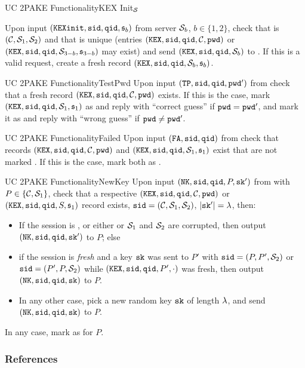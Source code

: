\documentclass[notes,xcolor=dvipsnames]{beamer}
\begin{document}
\begin{frame}{UC 2PAKE Functionality}{KEX Init$_\mathcal{S}$}
  
Upon input $(\mathtt{KEXinit}, \mathtt{sid}, \mathtt{qid}, \mathfrak{s}_b)$ from server $\mathcal{S}_b$, $b\in\{1,2\}$, check that \sid is $(\mathcal{C}, \mathcal{S}_1, \mathcal{S}_2)$ and that \qid is unique (entries $(\mathtt{KEX}, \mathtt{sid}, \mathtt{qid}, \mathcal{C}, \mathtt{pwd})$ or $(\mathtt{KEX}, \mathtt{sid}, \mathtt{qid}, \mathcal{S}_{3-b}, \mathfrak{s}_{3-b})$ may exist) and send $(\mathtt{KEX}, \mathtt{sid}, \mathtt{qid}, \mathcal{S}_b)$ to \SIM.
        If this is a valid request, create a fresh record $(\mathtt{KEX}, \mathtt{sid}, \mathtt{qid}, \mathcal{S}_b, \mathfrak{s}_b)$.
\end{frame}

\begin{frame}{UC 2PAKE Functionality}{TestPwd}  
    Upon input $(\mathtt{TP}, \mathtt{sid}, \mathtt{qid}, \mathtt{pwd}')$ from \SIM check that a fresh record $(\mathtt{KEX}, \mathtt{sid}, \mathtt{qid}, \mathcal{C}, \mathtt{pwd})$ exists. 
        If this is the case, mark $(\mathtt{KEX}, \mathtt{sid}, \mathtt{qid}, \mathcal{S}_1, \mathfrak{s}_1)$ as \compromised and reply with ``correct guess'' if $\mathtt{pwd}=\mathtt{pwd}'$, and mark it as \interrupted and reply with ``wrong guess'' if $\mathtt{pwd}\not=\mathtt{pwd}'$.
\end{frame}
      
\begin{frame}{UC 2PAKE Functionality}{Failed}
  Upon input $(\mathtt{FA}, \mathtt{sid}, \mathtt{qid})$ from \SIM check that records $(\mathtt{KEX}, \mathtt{sid}, \mathtt{qid}, \mathcal{C}, \mathtt{pwd})$ and $(\mathtt{KEX}, \mathtt{sid}, \mathtt{qid}, \mathcal{S}_1, \mathfrak{s}_1)$ exist that are not marked \completed. 
        If this is the case, mark both as \failed.
\end{frame}
  
\begin{frame}{UC 2PAKE Functionality}{NewKey}
	  Upon input $(\mathtt{NK}, \mathtt{sid},\mathtt{qid}, P, \mathtt{sk}')$ from \SIM with $P\in\{\mathcal{C},\mathcal{S}_1\}$, check that a respective $(\mathtt{KEX}, \mathtt{sid}, \mathtt{qid}, \mathcal{C}, \mathtt{pwd})$ or $(\mathtt{KEX}, \mathtt{sid}, \mathtt{qid}, S, \mathfrak{s}_1)$ record exists, $\mathtt{sid}=(\mathcal{C}, \mathcal{S}_1, \mathcal{S}_2)$, $|\mathtt{sk}'|=\lambda$, then: %
	  \begin{itemize}
		  \item If the session is \compromised, or either \Client or $\mathcal{S}_1$ and $\mathcal{S}_2$ are corrupted, then output $(\mathtt{NK}, \mathtt{sid},\mathtt{qid},\mathtt{sk}')$ to $P$; else
		
		  \item if the session is \emph{fresh} and a key $\mathtt{sk}$ was sent to $P'$ with $\mathtt{sid}=(P, P', \mathcal{S}_2)$ or $\mathtt{sid}=(P', P, \mathcal{S}_2)$ while $(\mathtt{KEX}, \mathtt{sid}, \mathtt{qid}, P', \cdot)$ was fresh, then output $(\mathtt{NK}, \mathtt{sid}, \mathtt{qid}, \mathtt{sk})$ to $P$.
		
		  \item In any other case, pick a new random key $\mathtt{sk}$ of length $\lambda$, and send $(\mathtt{NK}, \mathtt{sid}, \mathtt{qid}, \mathtt{sk})$ to $P$.
	  \end{itemize}
	  In any case, mark \qid as \completed for $P$.
\end{frame}  


\begin{frame}[allowframebreaks]
  \frametitle<presentation>{References}
  
  
\end{frame}
\backupend
\end{document}
